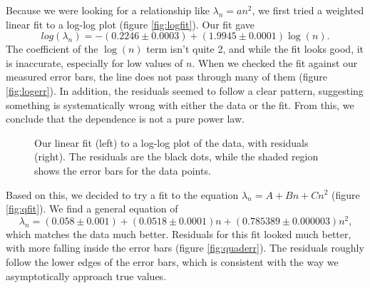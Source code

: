 \documentclass[12pt,twoside]{reedthesis}
\newcommand{\eqn}[1]{\begin{equation}#1\end{equation}}
\begin{document}
Because we were looking for a relationship like $\lambda_n = a n^2$, we first tried a weighted linear fit to a log-log plot (figure \ref{fig:logfit}). Our fit gave
\eqn{
log(\lambda_n) = -(0.2246 \pm 0.0003) + (1.9945 \pm 0.0001) \log(n)\mbox{.}
\label{eq:logfit}
} 
The coefficient of the $\log(n)$ term isn't quite 2, and while the fit looks good, it is inaccurate, especially for low values of $n$. When we checked the fit against our measured error bars, the line does not pass through many of them (figure \ref{fig:logerr}). In addition, the residuals seemed to follow a clear pattern, suggesting something is systematically wrong with either the data or the fit. From this, we conclude that the dependence is not a pure power law.
\begin{figure}[h]
\centering
{}
\caption[Log-log fit and residuals]{Our linear fit (left) to a log-log plot of the data, with residuals (right). The residuals are the black dots, while the shaded region shows the error bars for the data points.}
\label{fig:loglog}
\end{figure}

Based on this, we decided to try a fit to the equation $\lambda_n = A + B n + C n^2$ (figure \ref{fig:qfit}). We find a general equation of 
\eqn{
\lambda_n = (0.058 \pm 0.001) + (0.0518 \pm 0.0001) n + ( 0.785389 \pm 0.000003) n^2\mbox{,}
}
which matches the data much better. Residuals for this fit looked much better, with more falling inside the error bars (figure \ref{fig:quaderr}). The residuals roughly follow the lower edges of the error bars, which is consistent with the way we asymptotically approach true values.
\end{document}
